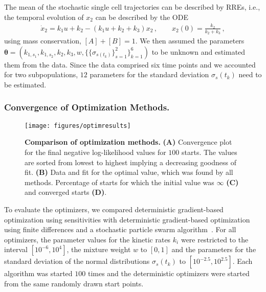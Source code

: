 \documentclass{llncs}
\newcommand{\vtheta}{\boldsymbol{\theta}}
\begin{document}
The mean of the stochastic single cell trajectories can be described by RREs, i.e., the temporal evolution of $x_2$ can be described by the ODE
\begin{align*}
\dot{x}_2 = k_1u+k_2-\left(k_1u+k_2+k_3\right)x_2\,,\qquad x_2(0) = \frac{k_2}{k_2+k_3}\,,
\end{align*}
using mass conservation, $[A]+[B] = 1$. We then assumed the parameters $\vtheta = (k_{1,s_1},k_{1,s_2},k_2,k_3,w,\{\{\sigma_{s(t_k)}\}_{s=1}^{2}\}_{k=1}^{6})$ to be unknown and estimated them from the data. Since the data comprised six time points and we accounted for two subpopulations, $12$ parameters for the standard deviation $\sigma_{s}(t_k)$ need to be estimated. 

\subsubsection{Convergence of Optimization Methods.}\label{sec:compare}
\begin{figure}[tb]
\centering
\texttt{[image: figures/optimresults]}
\caption{\textbf{Comparison of optimization methods.} \textbf{(A)} Convergence plot for the final negative log-likelihood values for $100$ starts. The values are sorted from lowest to highest implying a decreasing goodness of fit. \textbf{(B)} Data and fit for the optimal value, which was found by all methods. Percentage of starts for which the initial value was $\infty$ \textbf{(C)} and converged starts \textbf{(D)}.}\label{fig:optimresults}
\end{figure}
To evaluate the optimizers, we compared deterministic gradient-based optimization using sensitivities with deterministic gradient-based optimization using finite differences and a stochastic particle swarm algorithm~\cite{Vaz2006}. For all optimizers, the parameter values for the kinetic rates $k_i$ were restricted to the interval $[10^{-6},10^{4}]$, the mixture weight $w$ to $[0,1]$ and the parameters for the standard deviation of the normal distributions $\sigma_{s}(t_k)$ to $[10^{-2.5},10^{2.5}]$. Each algorithm was started $100$ times and the deterministic optimizers were started from the same randomly drawn start points. 
\end{document}
